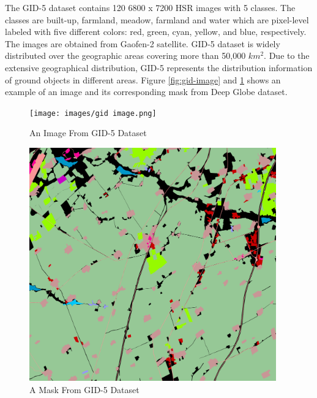 The GID-5 dataset \cite{GID2020} contains 120 6800 x 7200 HSR images with 5 classes. The classes are built-up, farmland, meadow, farmland and water which are pixel-level labeled with five different colors: red, green, cyan, yellow,
and blue, respectively. The images are obtained from Gaofen-2 satellite. GID-5 dataset is widely distributed over the geographic areas covering more than 50,000 $km^2$. Due to the extensive geographical distribution, GID-5 represents the distribution information of ground objects in different areas. Figure \ref{fig:gid-image} and \ref{fig:gid-mask} shows an example of an image and its corresponding mask from Deep Globe dataset.

\FloatBarrier
\begin{figure}[!htb]
    \centering
    \begin{minipage}{0.5\textwidth}
        \centering
        \texttt{[image: images/gid image.png]}
        \caption{An Image From GID-5 Dataset \protect\cite{GID2020}}
        \label{fig:gid-image}
    \end{minipage}\hfill
    \begin{minipage}{0.5\textwidth}
        \centering
        \includegraphics[width=0.95\textwidth, height=0.35\textheight]{images/gid mask.png}
\centering
\caption{A Mask From GID-5 Dataset \protect\cite{GID2020}}
\label{fig:gid-mask}
    \end{minipage}
\end{figure}
\FloatBarrier


